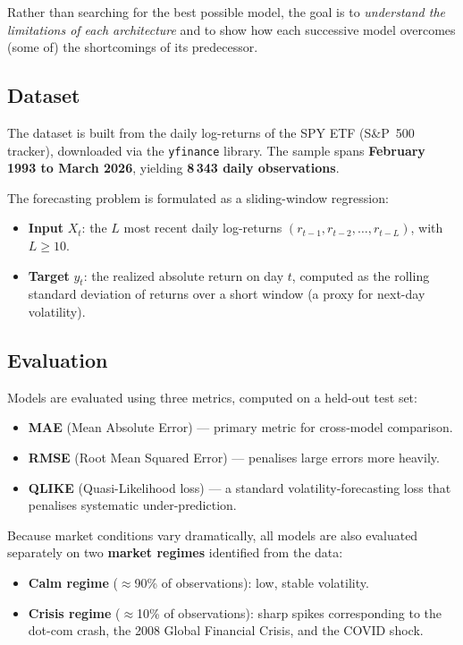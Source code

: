 Rather than searching for the best possible model, the goal is to \emph{understand the
limitations of each architecture} and to show how each successive model overcomes
(some of) the shortcomings of its predecessor.

\subsection{Dataset}

The dataset is built from the daily log-returns of the SPY ETF (S\&P~500 tracker),
downloaded via the \texttt{yfinance} library. The sample spans \textbf{February 1993 to
March 2026}, yielding \textbf{8\,343 daily observations}.

The forecasting problem is formulated as a sliding-window regression:
\begin{itemize}
  \item \textbf{Input} $X_t$: the $L$ most recent daily log-returns
        $(r_{t-1}, r_{t-2}, \ldots, r_{t-L})$, with $L \geq 10$.
  \item \textbf{Target} $y_t$: the realized absolute return on day $t$, computed as the
        rolling standard deviation of returns over a short window (a proxy for
        next-day volatility).
\end{itemize}

\subsection{Evaluation}

Models are evaluated using three metrics, computed on a held-out test set:

\begin{itemize}
  \item \textbf{MAE} (Mean Absolute Error) --- primary metric for cross-model comparison.
  \item \textbf{RMSE} (Root Mean Squared Error) --- penalises large errors more heavily.
  \item \textbf{QLIKE} (Quasi-Likelihood loss) --- a standard volatility-forecasting loss
        that penalises systematic under-prediction.
\end{itemize}

Because market conditions vary dramatically, all models are also evaluated separately on
two \textbf{market regimes} identified from the data:
\begin{itemize}
  \item \textbf{Calm regime} ($\approx$90\% of observations): low, stable volatility.
  \item \textbf{Crisis regime} ($\approx$10\% of observations): sharp spikes corresponding
        to the dot-com crash, the 2008 Global Financial Crisis, and the COVID shock.
\end{itemize}

